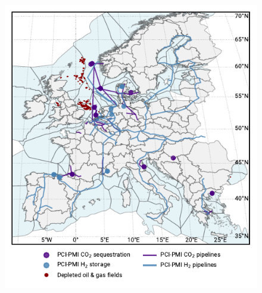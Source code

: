 \documentclass[pdflatex,sn-nature]{sn-jnl}%
\theoremstyle{thmstyleone}%
\theoremstyle{thmstyletwo}%
\theoremstyle{thmstylethree}%
\begin{document}
\begin{figure}[htbp]
  \centering
  \includegraphics{figures/map_adm_pcipmi}
  \label{fig:regional_scope_map}
\end{figure}
\end{document}
